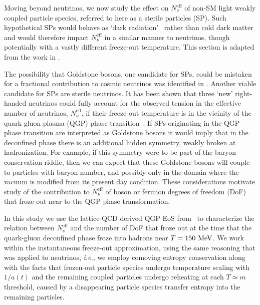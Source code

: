 Moving beyond neutrinos, we now study the effect on $N_\nu^{\text{eff}}$ of non-SM light weakly coupled  particle species, referred to here as a sterile particles (SP). Such hypothetical SPs would behave as `dark radiation'~\cite{Steigman:2013yua} rather than cold dark matter and would therefore impact $N_\nu^{\text{eff}}$ in a similar manner to neutrinos, though potentially with a vastly different freeze-out temperature.  This section is adapted from the work in \cite{Birrell:2014cja}.


The possibility that Goldstone bosons, one candidate for SPs,  could be mistaken for a fractional contribution to cosmic neutrinos was  identified in \cite{Weinberg:2013kea}.  Another viable candidate for SPs are sterile neutrinos. It has been shown that  three `new' right-handed neutrinos could fully account for the observed tension in the effective number of neutrinos, $N^{\text{eff}}_{\nu}$, if their freeze-out temperature    is in the vicinity of the quark gluon plasma (QGP) phase transition~\cite{Anchordoqui:2011nh,Anchordoqui:2012qu}.  If SPs originating in the QGP phase transition are interpreted as Goldstone bosons it would imply that in the deconfined phase there is  an additional hidden symmetry, weakly broken at hadronization.  For example, if this symmetry were to be part of the baryon conservation riddle, then we can expect that these Goldstone bosons will  couple to particles with baryon number, and possibly only in the domain where the vacuum is modified from its present day condition.  These considerations motivate  study of the contribution to 
$N^{\text{eff}}_{\nu}$ of boson or fermion degrees of freedom (DoF) that froze out near to the QGP phase transformation. 

In this study we use the  lattice-QCD derived QGP EoS from~\cite{Borsanyi:2013bia} to characterize the relation between $N^{\text{eff}}_{\nu}$ and the number of DoF that froze out at the time that the quark-gluon deconfined phase froze into hadrons near $T=150\text{ MeV}$.  We work within the instantaneous freeze-out approximation, using the same reasoning that was applied to neutrinos, {\it i.e.\/}, we employ comoving entropy conservation along with the facts that   frozen-out particle species undergo temperature scaling with $1/a(t)$  and the remaining coupled particles undergo reheating  at each $T\simeq m$ threshold, caused by a disappearing particle species transfer  entropy   into the remaining  particles.



